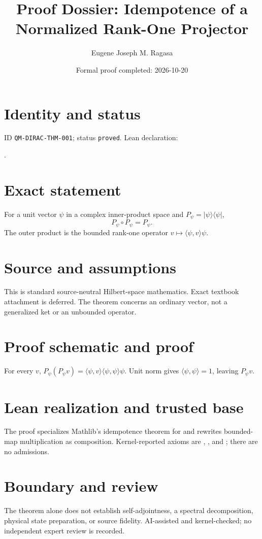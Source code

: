 \documentclass[11pt]{article}
\title{Proof Dossier: Idempotence of a Normalized Rank-One Projector}\author{Eugene Joseph M. Ragasa}\date{Formal proof completed: 2026-10-20}
\begin{document}
\maketitle
\section{Identity and status}
ID \texttt{QM-DIRAC-THM-001}; status \texttt{proved}. Lean declaration:
\par{}.
\section{Exact statement}
For a unit vector $\psi$ in a complex inner-product space and
$P_\psi=\lvert\psi\rangle\langle\psi\rvert$,
\[P_\psi\circ P_\psi=P_\psi.\]
The outer product is the bounded rank-one operator $v\mapsto\langle\psi,v\rangle\psi$.
\section{Source and assumptions}
This is standard source-neutral Hilbert-space mathematics. Exact textbook attachment is deferred.
The theorem concerns an ordinary vector, not a generalized ket or an unbounded operator.
\section{Proof schematic and proof}
For every $v$,
$P_\psi(P_\psi v)=\langle\psi,v\rangle\langle\psi,\psi\rangle\psi$.
Unit norm gives $\langle\psi,\psi\rangle=1$, leaving $P_\psi v$.
\section{Lean realization and trusted base}
The proof specializes Mathlib's idempotence theorem for  and rewrites bounded-map
multiplication as composition. Kernel-reported axioms are ,
, and ; there are no admissions.
\section{Boundary and review}
The theorem alone does not establish self-adjointness, a spectral decomposition, physical state
preparation, or source fidelity. AI-assisted and kernel-checked; no independent expert review is
recorded.
\end{document}
